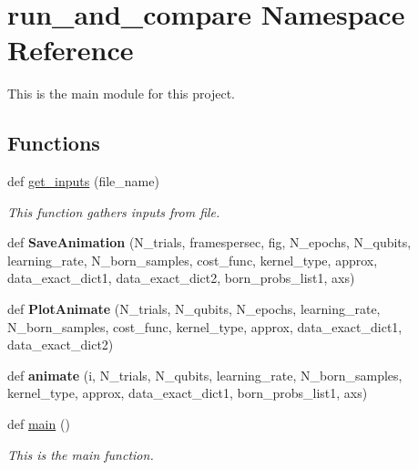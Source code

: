 \hypertarget{namespacerun__and__compare}{}\section{run\+\_\+and\+\_\+compare Namespace Reference}
\label{namespacerun__and__compare}


This is the main module for this project.  


\subsection*{Functions}
\begin{DoxyCompactItemize}
\item 
def \hyperlink{namespacerun__and__compare_a052c9e5e675a8039a841108710e53e2a}{get\+\_\+inputs} (file\+\_\+name)
\begin{DoxyCompactList}\small\item\em This function gathers inputs from file. \end{DoxyCompactList}\item 
\mbox{\label{namespacerun__and__compare_acaf1ba6931f81b19b0567c9cab1198b2}} 
def {\bfseries Save\+Animation} (N\+\_\+trials, framespersec, fig, N\+\_\+epochs, N\+\_\+qubits, learning\+\_\+rate, N\+\_\+born\+\_\+samples, cost\+\_\+func, kernel\+\_\+type, approx, data\+\_\+exact\+\_\+dict1, data\+\_\+exact\+\_\+dict2, born\+\_\+probs\+\_\+list1, axs)
\item 
\mbox{\label{namespacerun__and__compare_ac415fb17c08b762da017dda29d562d26}} 
def {\bfseries Plot\+Animate} (N\+\_\+trials, N\+\_\+qubits, N\+\_\+epochs, learning\+\_\+rate, N\+\_\+born\+\_\+samples, cost\+\_\+func, kernel\+\_\+type, approx, data\+\_\+exact\+\_\+dict1, data\+\_\+exact\+\_\+dict2)
\item 
\mbox{\label{namespacerun__and__compare_abe75a88a60f92da228c71c20053285e6}} 
def {\bfseries animate} (i, N\+\_\+trials, N\+\_\+qubits, learning\+\_\+rate, N\+\_\+born\+\_\+samples, kernel\+\_\+type, approx, data\+\_\+exact\+\_\+dict1, born\+\_\+probs\+\_\+list1, axs)
\item 
\mbox{\label{namespacerun__and__compare_adf62cfc970301ebe31f09a0c99ae3b48}} 
def \hyperlink{namespacerun__and__compare_adf62cfc970301ebe31f09a0c99ae3b48}{main} ()
\begin{DoxyCompactList}\small\item\em This is the main function. \end{DoxyCompactList}\end{DoxyCompactItemize}
